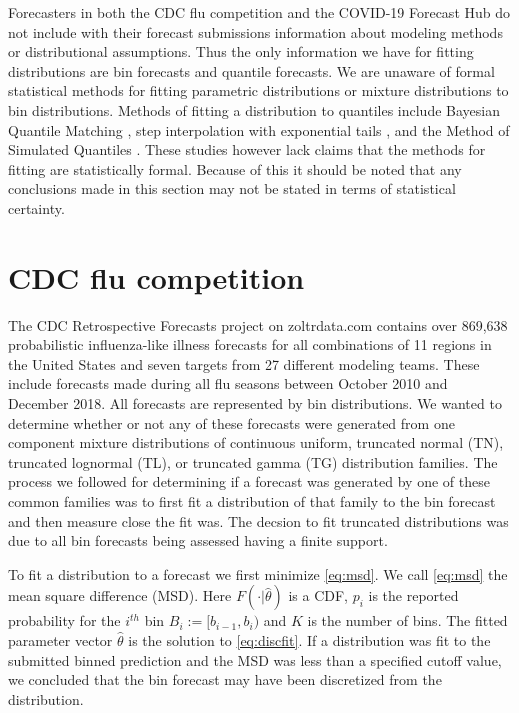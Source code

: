 \documentclass[11pt,notitlepage]{isuthesis}
\begin{document}
Forecasters in both the CDC flu competition and the COVID-19 Forecast Hub do 
not include with their forecast submissions information about modeling methods 
or 
distributional assumptions. Thus the only information we have for fitting
distributions are bin
forecasts and quantile forecasts. We are unaware of formal statistical 
methods for fitting parametric distributions or mixture distributions to bin
distributions. Methods of fitting a distribution to quantiles 
include Bayesian Quantile Matching
\cite[]{nirwan2020bayesian}, step interpolation with exponential tails 
\cite[]{quinonero2005evaluating},
and the Method of Simulated Quantiles 
\cite[]{dominicy2013method}. These studies however lack claims that the methods
for fitting are statistically formal.
Because of this it should be noted that any conclusions made in 
this section may not be 
stated in terms of statistical certainty.



\section{CDC flu competition}
The CDC Retrospective Forecasts project on zoltrdata.com \cite[]{zoltarflu} 
contains over
869,638 probabilistic influenza-like illness forecasts for all combinations
of 11 regions 
in the United States and seven targets from 27 different modeling teams. These
include forecasts made during all flu seasons between October 2010 and December
2018. All forecasts are represented by bin distributions. 
We wanted to determine whether or not any of these forecasts were
generated from one component mixture distributions of continuous uniform, 
truncated normal (TN), truncated
lognormal (TL), or truncated gamma (TG) distribution families.
The process we followed for determining if a forecast was generated by one of
these common families was to first fit a distribution of that family to the bin
forecast and then measure close the fit was. The decsion to fit truncated 
distributions was due to all bin forecasts being assessed having a finite 
support.

To fit a distribution to a forecast we first minimize \eqref{eq:msd}. We call
\eqref{eq:msd} the mean square difference (MSD).
Here $F(\cdot| \hat{\theta})$ is a CDF, $p_i$ is the reported probability for 
the $i^{th}$ bin $B_i := [b_{i-1}, b_i)$ and $K$ is the number of bins.
The fitted parameter vector $\hat{\theta}$ is the solution to 
\eqref{eq:discfit}.
If a distribution was fit to the submitted binned 
prediction
and the MSD was less than a 
specified cutoff value, we
concluded that the bin forecast may have been discretized from the 
distribution.
\end{document}
